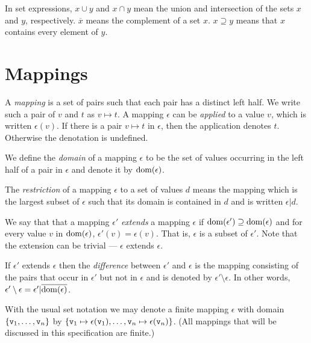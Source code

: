 In set expressions, $x\cup y$ and $x\cap y$
mean the union and intersection of the sets $x$ and $y$, respectively.
$\overline{x}$
means the complement
of a set $x$. $x\supseteq y$ means that $x$ contains
every element of $y$.

\section{Mappings}

\label{section:mappings}

A \emph{mapping} is a set of pairs such that each pair has a distinct
left half.  We write such a pair of $v$ and $t$ as $v\mapsto t$.  A
mapping $\epsilon$ can be \emph{applied}
to a value $v$, which is
written $\epsilon(v)$.  If there is a pair $v\mapsto t$ in $\epsilon$,
then the application denotes $t$.  Otherwise the denotation is
undefined.

We define the \emph{domain}
of a mapping $\epsilon$ to be the set of
values occurring in the left half of a pair in $\epsilon$ and
denote it by ${\rm dom}(\epsilon)$.

The \emph{restriction} of a mapping $\epsilon$ to a set of
values $d$ means the mapping which is the largest subset of $\epsilon$
such that its domain is contained in $d$ and is written $\epsilon|d$.

We say that that a mapping $\epsilon'$ \emph{extends} a mapping
$\epsilon$ if ${\rm dom}(\epsilon')\supseteq{\rm dom}(\epsilon)$ and for every
value $v$ in ${\rm dom}(\epsilon)$, $\epsilon'(v)=\epsilon(v)$.  That is,
$\epsilon$ is a subset of $\epsilon'$.  Note that the extension can be
trivial --- $\epsilon$ extends $\epsilon$.

If $\epsilon'$ extends $\epsilon$ then the \emph{difference} between
$\epsilon'$ and $\epsilon$ is the mapping consisting of the pairs
that occur in $\epsilon'$ but not in $\epsilon$ and is denoted by
$\epsilon'\setminus\epsilon$.  In other words, $\epsilon'\setminus\epsilon =
\epsilon'|\overline{{\rm dom}(\epsilon)}$.

With the usual set notation we may denote a finite mapping
$\epsilon$ with domain $\{{\tt{\sl v}}_1,\ldots,{\tt{\sl v}}_n\}$ by
$\{{\tt{\sl v}}_1\mapsto\epsilon({\tt{\sl v}}_1),\ldots,{\tt{\sl v}}_n\mapsto\epsilon({\tt{\sl v}}_n)\}$.
(All mappings that will be discussed in this specification are finite.)


